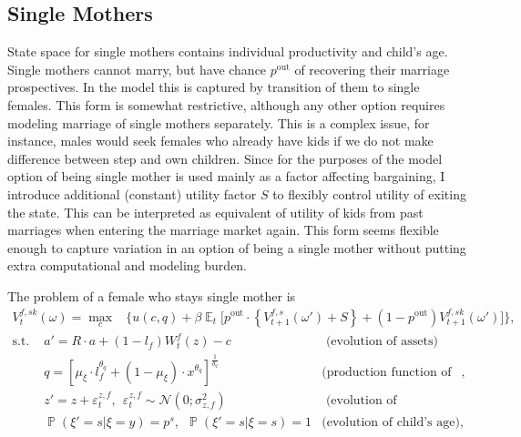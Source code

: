 \documentclass[12pt,letter]{article}
\DeclareMathOperator{\E}{\mathbb{E}}
\DeclareMathOperator{\PP}{\mathbb{P}}
\renewcommand{\P}{\PP}
\begin{document}
\subsection{Single Mothers}
State space for single mothers contains individual productivity and child's age. Single mothers cannot marry, but have chance $p^{\text{out}}$ of recovering their marriage prospectives. In the model this is captured by transition of them to single females. This form is somewhat restrictive, although any other option requires modeling marriage of single mothers separately. This is a complex issue, for instance, males would seek females who already have kids if we do not make difference between step and own children. Since for the purposes of the model option of being single mother is used mainly as a factor affecting bargaining, I introduce additional (constant) utility factor $S$ to flexibly control utility of exiting the state. This can be interpreted as equivalent of utility of kids from past marriages when entering the marriage market again. This form seems flexible enough to capture variation in an option of being a single mother without putting extra computational and modeling burden.

The problem of a female who stays single mother is
\begin{align}V^{f,sk}_t(\omega) = \max\limits_{c} & \bigg\{ u(c,q) + \beta \E_t \Big[ p^{\text{out}} \cdot \left\{ V^{f,s}_{t+1}(\omega') + S\right\} +(1-p^{\text{out}})V^{f,sk}_{t+1}(\omega') \Big]  \bigg\},
\end{align}\vspace{-1em}
\begin{align*}
 \text{s.t. \ }  &  a' = R\cdot a  + (1-l_f)W^f_t(z) - c  & \text{ (evolution of assets)}\\
 & q = [\mu_\xi\cdot l_f^{\theta_q} + (1-\mu_\xi)\cdot x^{\theta_q}]^{\frac1{\theta_q}} & \text{(production function of child quality)},\\
 &  z' = z + \varepsilon^{z,f}_t, \ \ \varepsilon^{z,f}_t \sim \mathcal{N}(0;\sigma_{z,f}^2) &  \text{ (evolution of productivity)}\\
 &  \P(\xi' = s | \xi = y) = p^s, \ \ \P(\xi' = s | \xi = s) = 1 & \text{(evolution of child's age)},\\
\end{align*}
\end{document}
